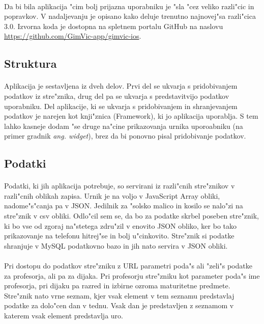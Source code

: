 \paragraph{}Da bi bila aplikacija "cim bolj prijazna uporabniku je "sla "cez veliko razli"cic in popravkov. V nadaljevanju je opisano kako deluje trenutno najnovej"sa razli"cica 3.0. Izvorna koda je dostopna na spletnem portalu GitHub na naslovu \url{https://github.com/GimVic-app/gimvic-ios}.

\subsection{Struktura}
\paragraph{}
Aplikacija je sestavljena iz dveh delov. Prvi del se ukvarja s pridobivanjem podatkov iz stre"znika, drug del pa se ukvarja s predstavitvijo podatkov uporabniku. Del aplikacije, ki se ukvarja s pridobivanjem in shranjevanjem podatkov je narejen kot knji"znica (Framework), ki jo aplikacija uporablja. S tem lahko kasneje dodam "se druge na"cine prikazovanja urnika uporoabniku (na primer gradnik \textit{ang. widget}), brez da bi ponovno pisal pridobivanje podatkov.

\subsection{Podatki} 
\paragraph{}Podatki, ki jih aplikacija potrebuje, so servirani iz razli"cnih stre"znikov v razli"cnih oblikah zapisa. Urnik je na voljo v JavaScript Array\cite{js-array} obliki, nadome"s"canja pa v JSON\cite{json-wiki}. Jedilnik za "solsko malico in kosilo se nalo"zi na stre"znik v csv\cite{csv-wiki} obliki. Odlo"cil sem se, da bo za podatke skrbel poseben stre"znik, ki bo vse od zgoraj na"stetega zdru"zil v enovito JSON obliko, ker bo tako prikazovanje na telefonu hitrej"se in bolj u"cinkovito. Stre"znik si podatke shranjuje v MySQL\cite{mysql-wiki} podatkovno bazo\cite{rin} in jih nato servira v JSON obliki.

\paragraph{}Pri dostopu do podatkov stre"zniku z URL parametri\cite{query-string-wiki} poda"s ali "zeli"s podatke za profesorja, ali pa za dijaka. Pri profesorju stre"zniku kot parameter poda"s ime profesorja, pri dijaku pa razred in izbirne ozroma maturitetne predmete. Stre"znik nato vrne seznam, kjer vsak element v tem seznamu predstavlaj podatke za dolo"cen dan v tednu. Vsak dan je predstavljen z seznamom v katerem vsak element predstavlja uro.


